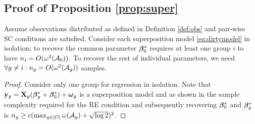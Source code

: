 \subsection{Proof of Proposition \ref{prop:super}}
\begin{prop}
	\label{prop:super}
	Assume observations distributed as defined in Definition \ref{def:obs} and pair-wise SC conditions are satisfied.  Consider each superposition model \eqref{eq:dirtymodel} in isolation; to recover the common parameter $\boldsymbol{\beta} _0^*$ requires at least one group $i$ to have $n_i = O(\omega^2({\cal A}_0))$. 
	To recover the rest of individual parameters, we need $\forall g \neq i: n_g = O(\omega^2({\cal A}_g))$ samples. 
\end{prop}
\begin{proof}
	Consider only one group for regression in isolation. 
	Note that $\mathbf{y}_g = \mathbf{X}_g (\boldsymbol{\beta} _g^* + \boldsymbol{\beta} _0^*) + \boldsymbol{\omega}_g$ is a superposition model and as shown in \cite{guba16} the sample complexity required for the RE condition and subsequently recovering $\boldsymbol{\beta} _0^*$ and $\boldsymbol{\beta} _g^*$ is $n_g  \geq c(\max_{g \in [G]}\omega({\cal A}_g) + \sqrt{\log 2})^2$.
\end{proof} 


